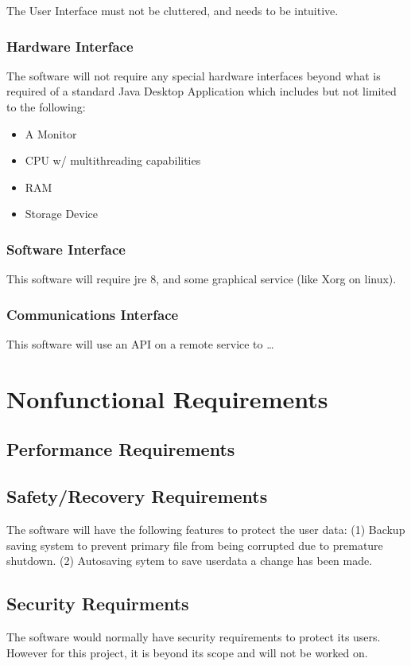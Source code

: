 \documentclass[12pt]{article}
\begin{document}
The User Interface must not be cluttered, and needs to be intuitive.

\subsubsection{ Hardware Interface}
The software will not require any special hardware interfaces beyond what is required of a standard Java Desktop Application which includes but not limited to the following:
\begin{itemize}
\item A Monitor
\item CPU w/ multithreading capabilities
\item RAM
\item Storage Device
\end{itemize}

\subsubsection{ Software Interface}
This software will require \acrshort{jre} 8, and some graphical service (like Xorg on linux).
\subsubsection{Communications Interface}
This software will use an API on a remote service to \ldots
\section{Nonfunctional Requirements}

\subsection{Performance Requirements}

\subsection{Safety/Recovery Requirements}

The software will have the following features to protect the user data: (1) Backup saving system to prevent primary file from being corrupted due to premature shutdown. (2) Autosaving sytem to save userdata a change has been made. 

\subsection{Security Requirments}
The software would normally have security requirements to protect its users. However for this project, it is beyond its scope and will not be worked on. 
\end{document}
